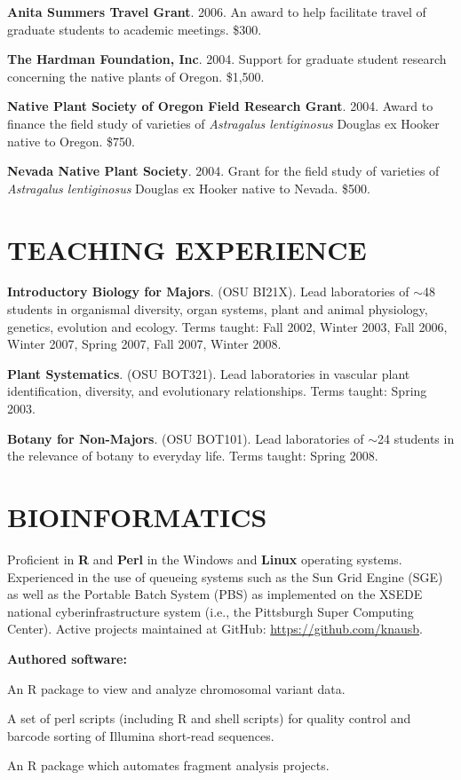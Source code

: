 \documentclass{article}
\newcommand{\NewPart}[1]{\section*{\uppercase{#1}}}
\newcommand{\AwardEntry}[3]{
		\noindent\hangindent=0.3in
		\textbf{#1}. #2. #3.
}
\begin{document}
\AwardEntry{Anita Summers Travel Grant}{2006}{An award to help facilitate travel of graduate students to academic meetings.  \$300}

\AwardEntry{The Hardman Foundation, Inc}{2004}{Support for graduate student research concerning the native plants of Oregon. \$1,500}

\AwardEntry{Native Plant Society of Oregon Field Research Grant}{2004}{Award to finance the field study of varieties of \emph{Astragalus lentiginosus} Douglas ex Hooker native to Oregon. \$750}

\AwardEntry{Nevada Native Plant Society}{2004}{Grant for the field study of varieties of \emph{Astragalus lentiginosus} Douglas ex Hooker native to Nevada. \$500}


\NewPart{Teaching Experience}{}

\AwardEntry{Introductory Biology for Majors}{(OSU BI21X)}{Lead laboratories of $\sim$48 students in organismal diversity, organ systems, plant and animal physiology, genetics, evolution and ecology.  Terms taught: Fall 2002, Winter 2003, Fall 2006, Winter 2007, Spring 2007, Fall 2007, Winter 2008}

\AwardEntry{Plant Systematics}{(OSU BOT321)}{Lead laboratories in vascular plant identification, diversity, and evolutionary relationships. Terms taught: Spring 2003}

\AwardEntry{Botany for Non-Majors}{(OSU BOT101)}{Lead laboratories of $\sim$24 students in the relevance of botany to everyday life. Terms taught: Spring 2008}


\NewPart{Bioinformatics}{}

Proficient in \textbf{R} and \textbf{Perl} in the Windows and \textbf{Linux} operating systems.  Experienced in the use of queueing systems such as the Sun Grid Engine (SGE) as well as the Portable Batch System (PBS) as implemented on the XSEDE national cyberinfrastructure system (i.e., the Pittsburgh Super Computing Center).  Active projects maintained at GitHub: \url{https://github.com/knausb}.

\vspace{6 pt}

\noindent
\textbf{Authored software:}
\begin{description} \itemsep0pt \parskip0pt
  \item[vcfR] An R package to view and analyze chromosomal variant data.
  \item[Short Read Toolbox] A set of perl scripts (including R and shell scripts) for quality control and barcode sorting of Illumina short-read sequences.
  \item[Genomatic] An R package which automates fragment analysis projects.
\end{description}
\end{document}
